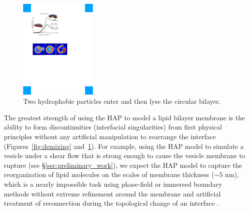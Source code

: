 \begin{figure}
\centerline{\includegraphics[width=0.34\textwidth]{figures/Lysis.pdf}}
  \vspace{-8pt}
  \caption{\label{fig:lysis} \footnotesize Two hydrophobic particles
  enter and then lyse the circular bilayer.}
\end{figure}
The greatest strength of using the HAP to model a lipid bilayer membrane is
the ability to form discontinuities (interfacial singularities) from first
physical principles without any artificial manipulation to rearrange the
interface (Figures~\ref{fig:demixing} and~\ref{fig:lysis}). For
example, using the HAP model to simulate a vesicle under a shear flow
that is strong enough to cause the vesicle membrane to rupture (see
\S\ref{sec:preliminary_work}), we expect the HAP model to capture the
reorganization of lipid molecules on the scales of membrane thickness
($\sim 5$ nm), which is a nearly impossible task using phase-field or
immersed boundary methods without extreme refinement around the membrane
and artificial treatment of reconnection during the topological change
of an interface \cite{doi:10.1063/5.0009734, LiAn-Chang16,
doi:10.1098/rspa.2012.0505, doi:10.1137/130941432, Feetzl18,
doi:10.1137/16M1108406}.






